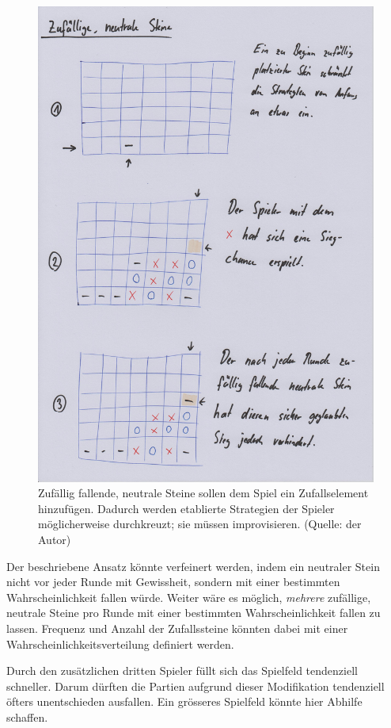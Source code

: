 \documentclass[a4paper,11pt,hidelinks]{scrartcl}
\begin{document}
\begin{figure}
    \centering
    \includegraphics[width=0.9\linewidth]{pics/neutral-papier.jpg}
    \caption{Zufällig fallende, neutrale Steine sollen dem Spiel ein Zufallselement hinzufügen. Dadurch werden etablierte Strategien der Spieler möglicherweise durchkreuzt; sie müssen improvisieren. (Quelle: der Autor)}
    \label{fig:neutral}
\end{figure}

Der beschriebene Ansatz könnte verfeinert werden, indem ein neutraler Stein nicht vor jeder Runde mit Gewissheit, sondern mit einer bestimmten Wahrscheinlichkeit fallen würde. Weiter wäre es möglich, \textit{mehrere} zufällige, neutrale Steine pro Runde mit einer bestimmten Wahrscheinlichkeit fallen zu lassen. Frequenz und Anzahl der Zufallssteine könnten dabei mit einer Wahrscheinlichkeitsverteilung definiert werden.

Durch den zusätzlichen dritten Spieler füllt sich das Spielfeld tendenziell schneller. Darum dürften die Partien aufgrund dieser Modifikation tendenziell öfters unentschieden ausfallen. Ein grösseres Spielfeld könnte hier Abhilfe schaffen.
\end{document}
